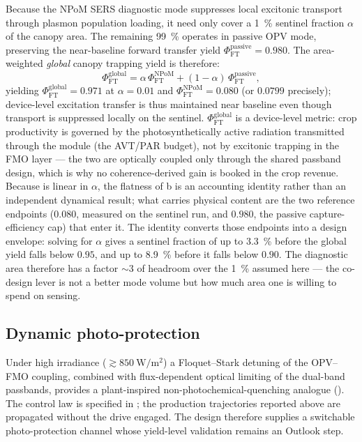 \documentclass[preprint,12pt]{elsarticle}
\begin{document}
Because the NPoM SERS diagnostic mode suppresses local excitonic transport through plasmon population loading, it need only cover a \qty{1}{\percent} sentinel fraction $\alpha$ of the canopy area. The remaining \qty{99}{\percent} operates in passive OPV mode, preserving the near-baseline forward transfer yield $\Phi_{\mathrm{FT}}^{\mathrm{passive}} = 0.980$. The area-weighted \emph{global} canopy trapping yield is therefore:
\begin{equation}
  \Phi_{\mathrm{FT}}^{\mathrm{global}} = \alpha\,\Phi_{\mathrm{FT}}^{\mathrm{NPoM}} + (1-\alpha)\,\Phi_{\mathrm{FT}}^{\mathrm{passive}},
  \label{eq:phi_global}
\end{equation}
yielding $\Phi_{\mathrm{FT}}^{\mathrm{global}} = 0.971$ at $\alpha = 0.01$ and $\Phi_{\mathrm{FT}}^{\mathrm{NPoM}} = 0.080$ (or $0.0799$ precisely); device-level excitation transfer is thus maintained near baseline even though transport is suppressed locally on the sentinel.
$\Phi_{\mathrm{FT}}^{\mathrm{global}}$ is a device-level metric: crop productivity is governed by the photosynthetically active radiation transmitted through the module (the AVT/PAR budget), not by excitonic trapping in the FMO layer --- the two are optically coupled only through the shared passband design, which is why no coherence-derived gain is booked in the crop revenue.
Because  is linear in $\alpha$, the flatness of b is an accounting identity rather than an independent dynamical result; what carries physical content are the two reference endpoints ($\num{0.080}$, measured on the sentinel run, and $\num{0.980}$, the passive capture-efficiency cap) that enter it.
The identity converts those endpoints into a design envelope: solving  for $\alpha$ gives a sentinel fraction of up to \qty{3.3}{\percent} before the global yield falls below $0.95$, and up to \qty{8.9}{\percent} before it falls below $0.90$.
The diagnostic area therefore has a factor $\sim 3$ of headroom over the \qty{1}{\percent} assumed here --- the co-design lever is not a better mode volume but how much area one is willing to spend on sensing.

\subsection{Dynamic photo-protection}
Under high irradiance ($\gtrsim\qty{850}{\W\per\m\squared}$) a Floquet--Stark detuning of the OPV--FMO coupling, combined with flux-dependent optical limiting of the dual-band passbands, provides a plant-inspired non-photochemical-quenching analogue (). The control law is specified in ; the production trajectories reported above are propagated without the drive engaged. The design therefore supplies a switchable photo-protection channel whose yield-level validation remains an Outlook step.
\end{document}

